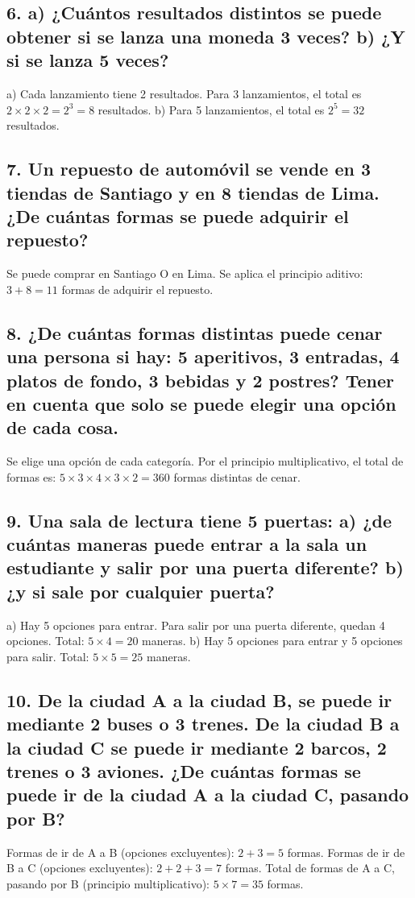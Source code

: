 \documentclass[11pt]{article}
\begin{document}
    \subsection*{6. a) ¿Cuántos resultados distintos se puede obtener si se lanza una moneda 3 veces? b) ¿Y si se lanza 5 veces?}
    a) Cada lanzamiento tiene 2 resultados. Para 3 lanzamientos, el total es $2 \times 2 \times 2 = 2^3 = 8$ resultados.
    b) Para 5 lanzamientos, el total es $2^5 = 32$ resultados.

    \subsection*{7. Un repuesto de automóvil se vende en 3 tiendas de Santiago y en 8 tiendas de Lima. ¿De cuántas formas se puede adquirir el repuesto?}
    Se puede comprar en Santiago O en Lima. Se aplica el principio aditivo: $3 + 8 = 11$ formas de adquirir el repuesto.

    \subsection*{8. ¿De cuántas formas distintas puede cenar una persona si hay: 5 aperitivos, 3 entradas, 4 platos de fondo, 3 bebidas y 2 postres? Tener en cuenta que solo se puede elegir una opción de cada cosa.}
    Se elige una opción de cada categoría. Por el principio multiplicativo, el total de formas es: $5 \times 3 \times 4 \times 3 \times 2 = 360$ formas distintas de cenar.

    \subsection*{9. Una sala de lectura tiene 5 puertas: a) ¿de cuántas maneras puede entrar a la sala un estudiante y salir por una puerta diferente? b) ¿y si sale por cualquier puerta?}
    a) Hay 5 opciones para entrar. Para salir por una puerta diferente, quedan 4 opciones. Total: $5 \times 4 = 20$ maneras.
    b) Hay 5 opciones para entrar y 5 opciones para salir. Total: $5 \times 5 = 25$ maneras.

    \subsection*{10. De la ciudad A a la ciudad B, se puede ir mediante 2 buses o 3 trenes. De la ciudad B a la ciudad C se puede ir mediante 2 barcos, 2 trenes o 3 aviones. ¿De cuántas formas se puede ir de la ciudad A a la ciudad C, pasando por B?}
    Formas de ir de A a B (opciones excluyentes): $2 + 3 = 5$ formas.
    Formas de ir de B a C (opciones excluyentes): $2 + 2 + 3 = 7$ formas.
    Total de formas de A a C, pasando por B (principio multiplicativo): $5 \times 7 = 35$ formas.
\end{document}
